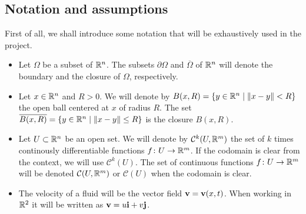 
\subsection{Notation and assumptions}

First of all, we shall introduce some notation that will be exhaustively used in
the project.
\begin{itemize}[topsep=0pt]
    \item Let $\Omega$ be a subset of $\mathbb{R}^n$. The subsets $\partial \Omega$ and
    $\overline{\Omega}$ of $\mathbb{R}^n$ will denote the boundary and the closure of $\Omega$,
    respectively. 
    \item Let $x \in \mathbb{R}^n$ and $R > 0$. We will denote by $B(x, R) = \{y \in
    \mathbb{R}^n \mid \norm{x - y} < R \}$ the open ball centered at $x$ of radius
    $R$. The set $\overline{B(x, R)} = \{y \in \mathbb{R}^n \mid \norm{x - y} \leq R
    \}$ is the closure $B(x, R)$.
    \item Let $U \subset \mathbb{R}^n$ be an open set. We will denote by
    $\mathcal{C}^k(U, \mathbb{R}^m)$ the set of $k$ times continously differentiable
    functions $f \colon U \rightarrow \mathbb{R}^m$. If the codomain is clear from
    the context, we will use $\mathcal{C}^k(U)$. The set of continuous functions
    $f \colon U \rightarrow \mathbb{R}^m$ will be denoted $\mathcal{C}(U, \mathbb{R}^m)$
    or $\mathcal{C}(U)$ when the codomain is clear.
	\item The velocity of a fluid will be the vector field $\vb{v} =
	\vb{v}(x,t)$. When working in $\mathbb{R}^2$ it will be written as $\vb{v} = u
	\vb{i} + v \vb{j}$.
\end{itemize}

